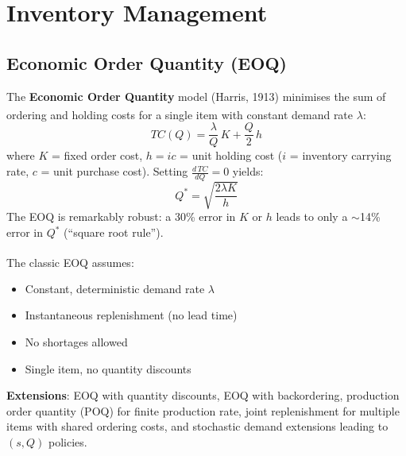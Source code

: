 \section{Inventory Management}

\subsection{Economic Order Quantity (EOQ)}

\begin{tcbitemize}[ skin=sectionraster ]

    \tcbitem[title=Harris EOQ Formula, raster multicolumn=3]
    The \textbf{Economic Order Quantity} model (Harris, 1913) minimises the sum of ordering and holding costs for a single item with constant demand rate $\lambda$\textsuperscript{\cite{harrisHowManyParts1913}}:
    \begin{equation}
        TC(Q) = \frac{\lambda}{Q}\,K + \frac{Q}{2}\,h
    \end{equation}
    where $K$ = fixed order cost, $h = ic$ = unit holding cost ($i$ = inventory carrying rate, $c$ = unit purchase cost).
    Setting $\frac{d\,TC}{dQ}=0$ yields:
    \begin{equation}
        Q^* = \sqrt{\frac{2\lambda K}{h}}
    \end{equation}
    The EOQ is remarkably robust: a 30\% error in $K$ or $h$ leads to only a $\sim$14\% error in $Q^*$ (``square root rule'').

    \tcbitem[title=EOQ Assumptions and Extensions, raster multicolumn=3]
    The classic EOQ assumes\textsuperscript{\cite[][pp.~936--942]{hillierIntroductionOperationsResearch2020}}:
    \begin{itemize}
        \item Constant, deterministic demand rate $\lambda$
        \item Instantaneous replenishment (no lead time)
        \item No shortages allowed
        \item Single item, no quantity discounts
    \end{itemize}
    \textbf{Extensions}: EOQ with quantity discounts, EOQ with backordering, production order quantity (POQ) for finite production rate, joint replenishment for multiple items with shared ordering costs, and stochastic demand extensions leading to $(s,Q)$ policies.

\end{tcbitemize}

